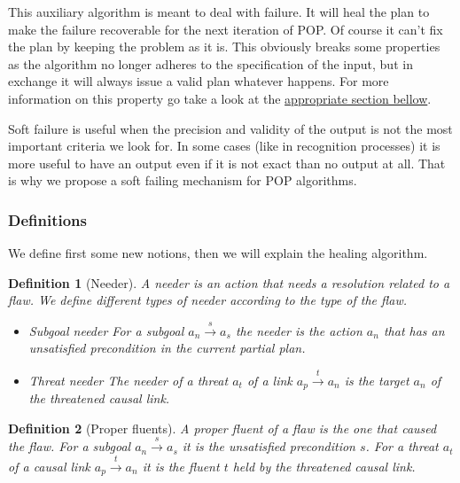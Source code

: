 \documentclass[]{article}
\newtheorem{definition}{Definition}
\begin{document}
This auxiliary algorithm is meant to deal with failure. It will heal the
plan to make the failure recoverable for the next iteration of POP. Of
course it can't fix the plan by keeping the problem as it is. This
obviously breaks some properties as the algorithm no longer adheres to
the specification of the input, but in exchange it will always issue a
valid plan whatever happens. For more information on this property go
take a look at the \protect\hyperlink{hypersoundness}{appropriate
section bellow}.

Soft failure is useful when the precision and validity of the output is
not the most important criteria we look for. In some cases (like in
recognition processes) it is more useful to have an output even if it is
not exact than no output at all. That is why we propose a soft failing
mechanism for POP algorithms.

\subsubsection{Definitions}\label{definitions-1}

We define first some new notions, then we will explain the healing
algorithm.

\begin{definition}[Needer]

A needer is an action that needs a resolution related to a flaw. We
define different types of needer according to the type of the flaw.

\begin{itemize}
\item
  Subgoal needer For a subgoal \(a_n \xrightarrow{s} a_s\) the needer is
  the action \(a_n\) that has an unsatisfied precondition in the current
  partial plan.
\item
  Threat needer The needer of a threat \(a_t\) of a link
  \(a_p \xrightarrow{t} a_n\) is the target \(a_n\) of the threatened
  causal link.
\end{itemize}

\end{definition}

\begin{definition}[Proper fluents]

A proper fluent of a flaw is the one that caused the flaw. For a subgoal
\(a_n \xrightarrow{s} a_s\) it is the unsatisfied precondition \(s\).
For a threat \(a_t\) of a causal link \(a_p \xrightarrow{t} a_n\) it is
the fluent \(t\) held by the threatened causal link.

\end{definition}
\end{document}
